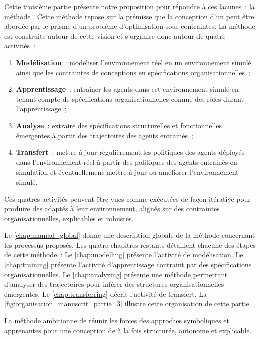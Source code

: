 \noindent
Cette troisième partie présente notre proposition pour répondre à ces lacunes~: la méthode . Cette méthode repose sur la prémisse que la conception d'un  peut être abordée par le prisme d'un problème d'optimisation sous contraintes. La méthode est construite autour de cette vision et s'organise donc autour de quatre activités~:

\begin{enumerate}
    \item \textbf{Modélisation}~: modéliser l'environnement réel en un environnement simulé ainsi que les contraintes de conceptions en spécifications organisationnelles~;
    \item \textbf{Apprentissage}~: entraîner les agents dans cet environnement simulé en tenant compte de spécifications organisationnelles comme des rôles durant l'apprentissage~;
    \item \textbf{Analyse}~: extraire des spécifications structurelles et fonctionnelles émergentes à partir des trajectoires des agents entrainés~;
    \item \textbf{Transfert}~: mettre à jour régulièrement les politiques des agents déployés dans l'environnement réel à partir des politiques des agents entrainés en simulation et éventuellement mettre à jour ou améliorer l'environnement simulé.
\end{enumerate}

\noindent
Ces quatres activités peuvent être vues comme exécutées de façon itérative pour produire des  adaptés à leur environnement, alignés sur des contraintes organisationnelles, explicables et robustes.

\medskip

\noindent
Le \autoref{chap:mamad_global} donne une description globale de la méthode concernant les processus proposés. Les quatre chapitres restants détaillent chacune des étapes de cette méthode~:
Le \autoref{chap:modelling} présente l'activité de modélisation.
Le \autoref{chap:training} présente l'activité d'apprentissage contraint par des spécifications organisationnelles.
Le \autoref{chap:analyzing} présente une méthode permettant d'analyser des trajectoires pour inférer des structures organisationnelles émergentes.
Le \autoref{chap:transferring} décrit l'activité de transfert.
La \autoref{fig:organisation_manuscrit_partie_3} illustre cette organisation de cette partie.

La méthode  ambitionne de réunir les forces des approches symboliques et apprenantes pour une conception de  à la fois structurée, autonome et explicable.

